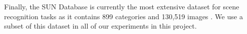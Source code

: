 \documentclass[11pt]{article}
\begin{document}
Finally, the SUN Database is currently the most extensive dataset for scene recognition tasks as it contains 899 categories and 130,519 images \cite{SUN}. We use a subset of this dataset in all of our experiments in this project.




\end{document}
